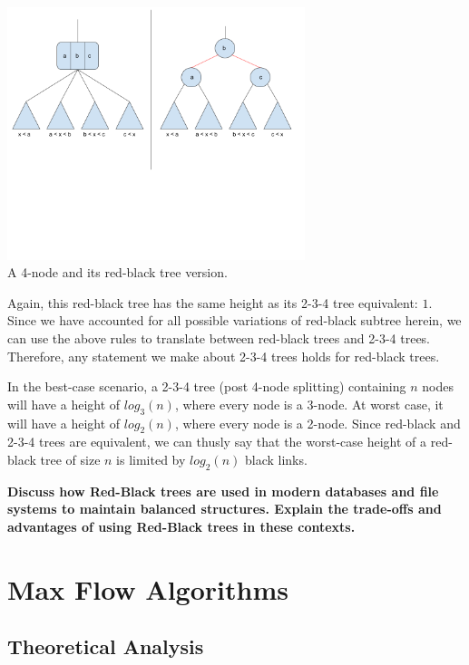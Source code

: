 \documentclass[12pt]{amsart}
\begin{document}
\begin{center}
    \includegraphics[width=0.65\textwidth]{rb_tree_2} \\
    A 4-node and its red-black tree version. \\
    \vskip 1cm
\end{center}

    Again, this red-black tree has the same height as its 2-3-4
    tree equivalent: $1$. Since we have accounted for all
    possible variations of red-black subtree herein, we can use
    the above rules to translate between red-black trees and
    2-3-4 trees. Therefore, any statement we make about 2-3-4
    trees holds for red-black trees.

    In the best-case scenario, a 2-3-4 tree (post 4-node
    splitting) containing $n$ nodes will have a height of
    $log_3(n)$, where every node is a 3-node. At worst case, it
    will have a height of $log_2(n)$, where every node is a
    2-node. Since red-black and 2-3-4 trees are equivalent, we
    can thusly say that the worst-case height of a red-black
    tree of size $n$ is limited by $log_2(n)$ black links.

    \newpage
    \textbf{Discuss how Red-Black trees are used in modern
    databases and file systems to maintain balanced structures.
    Explain the trade-offs and advantages of using Red-Black
    trees in these contexts.}


\section{Max Flow Algorithms}

\subsection{Theoretical Analysis}
\end{document}

